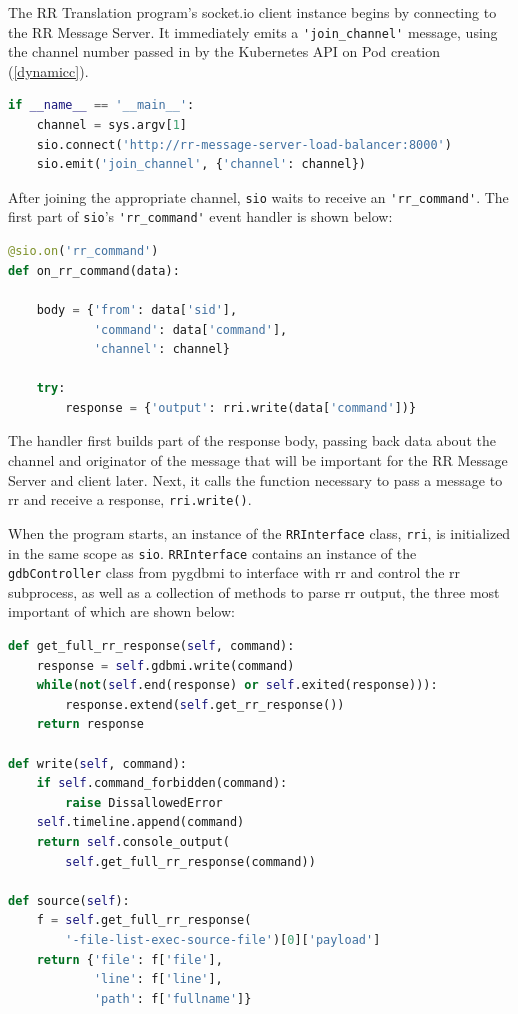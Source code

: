 \documentclass[12pt]{article}
\begin{document}
The RR Translation program's socket.io client instance begins by
connecting to the RR Message Server.  It immediately emits a
\lstinline{'join_channel'} message, using the channel number passed in
by the Kubernetes API on Pod creation (\ref{dynamicc}).

\begin{lstlisting}[language=Python,basicstyle=\linespread{0.5}\ttfamily,caption={RR Translation Main},captionpos=b]
if __name__ == '__main__':
    channel = sys.argv[1]
    sio.connect('http://rr-message-server-load-balancer:8000')
    sio.emit('join_channel', {'channel': channel})
\end{lstlisting}

After joining the appropriate channel, \lstinline{sio} waits to
receive an \lstinline{'rr_command'}.  The first part of
\lstinline{sio}'s \lstinline{'rr_command'} event handler is shown below:

\begin{lstlisting}[language=Python,basicstyle=\linespread{0.5}\ttfamily,caption={RR Command Event Handler},captionpos=b]
@sio.on('rr_command')
def on_rr_command(data):

    body = {'from': data['sid'],
            'command': data['command'],
            'channel': channel}
    
    try:
        response = {'output': rri.write(data['command'])}
\end{lstlisting}

The handler first builds part of the response body, passing back data
about the channel and originator of the message that will be important
for the RR Message Server and client later.  Next, it calls the
function necessary to pass a message to rr and receive a response,
\lstinline{rri.write()}.
\par

When the program starts, an instance of the \lstinline{RRInterface}
class, \lstinline{rri}, is initialized in the same scope as
\lstinline{sio}.  \lstinline{RRInterface} contains an instance of the
\lstinline{gdbController} class from pygdbmi to interface with rr and
control the rr subprocess, as well as a collection of methods to parse
rr output, the three most important of which are shown below: 

\begin{lstlisting}[language=Python,basicstyle=\linespread{0.5}\ttfamily,caption={RRInterface},captionpos=b]
def get_full_rr_response(self, command):
    response = self.gdbmi.write(command)
    while(not(self.end(response) or self.exited(response))):
        response.extend(self.get_rr_response())
    return response

def write(self, command):
    if self.command_forbidden(command):
        raise DissallowedError
    self.timeline.append(command)
    return self.console_output(
        self.get_full_rr_response(command))

def source(self):
    f = self.get_full_rr_response(
        '-file-list-exec-source-file')[0]['payload']
    return {'file': f['file'],
            'line': f['line'],
            'path': f['fullname']}
\end{lstlisting}
\end{document}
